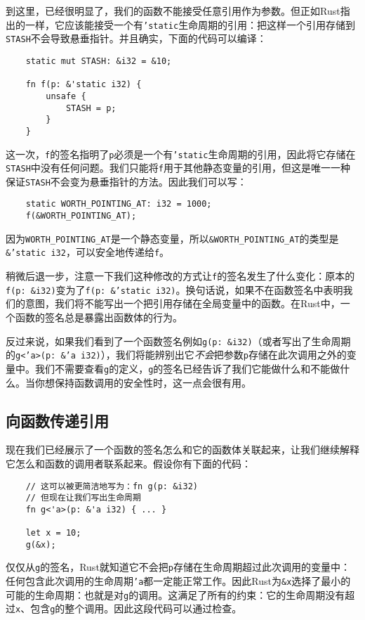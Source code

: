 到这里，已经很明显了，我们的函数不能接受任意引用作为参数。但正如Rust指出的一样，它应该能接受一个有\texttt{'static}生命周期的引用：把这样一个引用存储到\texttt{STASH}不会导致悬垂指针。并且确实，下面的代码可以编译：
\begin{verbatim}
    static mut STASH: &i32 = &10;

    fn f(p: &'static i32) {
        unsafe {
            STASH = p;
        }
    }
\end{verbatim}

这一次，\texttt{f}的签名指明了\texttt{p}必须是一个有\texttt{'static}生命周期的引用，因此将它存储在\texttt{STASH}中没有任何问题。我们只能将\texttt{f}用于其他静态变量的引用，但这是唯一一种保证\texttt{STASH}不会变为悬垂指针的方法。因此我们可以写：
\begin{verbatim}
    static WORTH_POINTING_AT: i32 = 1000;
    f(&WORTH_POINTING_AT);
\end{verbatim}

因为\texttt{WORTH\_POINTING\_AT}是一个静态变量，所以\texttt{\&WORTH\_POINTING\_AT}的类型是\texttt{\&'static i32}，可以安全地传递给\texttt{f}。

稍微后退一步，注意一下我们这种修改的方式让\texttt{f}的签名发生了什么变化：原本的\texttt{f(p: \&i32)}变为了\texttt{f(p: \&'static i32)}。换句话说，如果不在函数签名中表明我们的意图，我们将不能写出一个把引用存储在全局变量中的函数。在Rust中，一个函数的签名总是暴露出函数体的行为。

反过来说，如果我们看到了一个函数签名例如\texttt{g(p: \&i32)}（或者写出了生命周期的\texttt{g<'a>(p: \&'a i32)}），我们将能辨别出它\emph{不会}把参数\texttt{p}存储在此次调用之外的变量中。我们不需要查看\texttt{g}的定义，\texttt{g}的签名已经告诉了我们它能做什么和不能做什么。当你想保持函数调用的安全性时，这一点会很有用。

\subsection{向函数传递引用}
现在我们已经展示了一个函数的签名怎么和它的函数体关联起来，让我们继续解释它怎么和函数的调用者联系起来。假设你有下面的代码：
\begin{verbatim}
    // 这可以被更简洁地写为：fn g(p: &i32)
    // 但现在让我们写出生命周期
    fn g<'a>(p: &'a i32) { ... }

    let x = 10;
    g(&x);
\end{verbatim}

仅仅从\texttt{g}的签名，Rust就知道它不会把\texttt{p}存储在生命周期超过此次调用的变量中：任何包含此次调用的生命周期\texttt{'a}都一定能正常工作。因此Rust为\texttt{\&x}选择了最小的可能的生命周期：也就是对\texttt{g}的调用。这满足了所有的约束：它的生命周期没有超过\texttt{x}、包含\texttt{g}的整个调用。因此这段代码可以通过检查。

